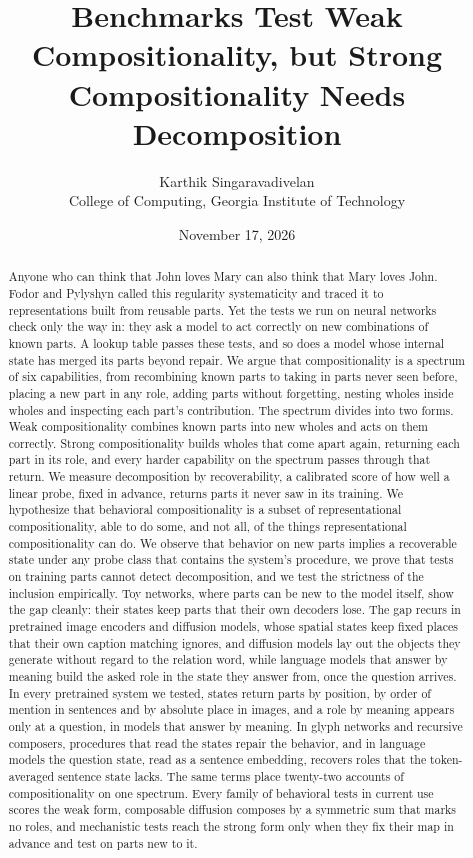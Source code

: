 \documentclass[10pt]{article}
\title{Benchmarks Test Weak Compositionality, but Strong Compositionality Needs Decomposition}
\author{Karthik Singaravadivelan\\ College of Computing, Georgia Institute of Technology}
\date{November 17, 2026}
\theoremstyle{plain}
\theoremstyle{remark}
\begin{document}
\maketitle

\begin{abstract}
Anyone who can think that John loves Mary can also think that Mary loves John. Fodor and Pylyshyn called this regularity systematicity and traced it to representations built from reusable parts. Yet the tests we run on neural networks check only the way in: they ask a model to act correctly on new combinations of known parts. A lookup table passes these tests, and so does a model whose internal state has merged its parts beyond repair. We argue that compositionality is a spectrum of six capabilities, from recombining known parts to taking in parts never seen before, placing a new part in any role, adding parts without forgetting, nesting wholes inside wholes and inspecting each part's contribution. The spectrum divides into two forms. Weak compositionality combines known parts into new wholes and acts on them correctly. Strong compositionality builds wholes that come apart again, returning each part in its role, and every harder capability on the spectrum passes through that return. We measure decomposition by recoverability, a calibrated score of how well a linear probe, fixed in advance, returns parts it never saw in its training. We hypothesize that behavioral compositionality is a subset of representational compositionality, able to do some, and not all, of the things representational compositionality can do. We observe that behavior on new parts implies a recoverable state under any probe class that contains the system's procedure, we prove that tests on training parts cannot detect decomposition, and we test the strictness of the inclusion empirically. Toy networks, where parts can be new to the model itself, show the gap cleanly: their states keep parts that their own decoders lose. The gap recurs in pretrained image encoders and diffusion models, whose spatial states keep fixed places that their own caption matching ignores, and diffusion models lay out the objects they generate without regard to the relation word, while language models that answer by meaning build the asked role in the state they answer from, once the question arrives. In every pretrained system we tested, states return parts by position, by order of mention in sentences and by absolute place in images, and a role by meaning appears only at a question, in models that answer by meaning. In glyph networks and recursive composers, procedures that read the states repair the behavior, and in language models the question state, read as a sentence embedding, recovers roles that the token-averaged sentence state lacks. The same terms place twenty-two accounts of compositionality on one spectrum. Every family of behavioral tests in current use scores the weak form, composable diffusion composes by a symmetric sum that marks no roles, and mechanistic tests reach the strong form only when they fix their map in advance and test on parts new to it.
\end{abstract}
\end{document}
